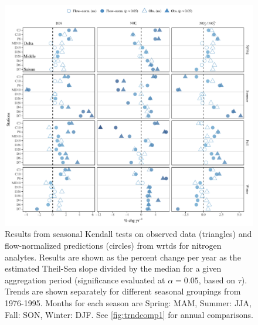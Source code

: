 \documentclass[journal = esthag, manuscript = article]{achemso}\usepackage[]{graphicx}\usepackage[]{color}
\begin{document}
\begin{suppinfo}
\begin{figure}
\centering
\includegraphics[width=1\textwidth,page=1]{figs/trndcomp2.pdf}
\caption{Results from seasonal Kendall tests on observed data (triangles) and flow-normalized predictions (circles) from \ac{wrtds} for nitrogen analytes. Results are shown as the percent change per year as the estimated Theil-Sen slope divided by the median for a given aggregation period (significance evaluated at $\alpha = 0.05$, based on $\tau$). Trends are shown separately for different seasonal groupings from 1976-1995. Months for each season are Spring: MAM, Summer: JJA, Fall: SON, Winter: DJF. See \cref{fig:trndcomp1} for annual comparisons.}
\label{fig:trndcomp2}   
\end{figure}


\end{suppinfo}
\end{document}
